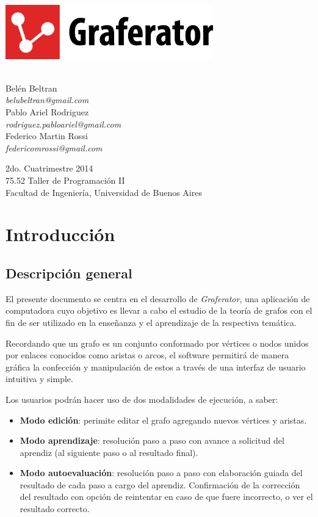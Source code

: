 \documentclass{book}
\makeatletter
\newcommand*{\titleGM}{\begingroup %
\newcommand*{\sepline}{\color{gray85}\rule[0.5ex]{30em}{0.55pt}}
	
	
\begin{center}

	\vspace*{1.5cm} 

	\includegraphics[width=9cm]{images/graferator-logo.png} \\[12\baselineskip]

	
	\colorbox{gray95}{
		\parbox[t]{1.0\linewidth}{
			\vspace*{0.7cm} %
			
			\centering {\Huge\bfseries\color{gray50}\fontfamily{fvs}\selectfont Carpeta de Desarrollo}\par %
			
			\vspace*{0.7cm} %
		}
	}\\[10\baselineskip]


		\Large Belén Beltran \\
		\large \textit{belubeltran@gmail.com} \\ \medskip
		\Large Pablo Ariel Rodriguez \\
		\large \textit{rodriguez.pabloariel@gmail.com} \\ \medskip
		\Large Federico Martin Rossi \\ 
		\large \textit{federicomrossi@gmail.com} \\

		\bigskip\bigskip

		\large 2do. Cuatrimestre 2014 \\ \smallskip
		\large 75.52 Taller de Programación II \\ \smallskip
		\large Facultad de Ingeniería, Universidad de Buenos Aires \\

\end{center}

\endgroup}
\makeatother
\begin{document}

\thispagestyle{empty}


\titleGM




\tableofcontents
\newpage
\thispagestyle{empty}
\thispagestyle{empty}
\thispagestyle{empty}



%
%
\chapter{Introducción}


\section{Descripción general}
	
El presente documento se centra en el desarrollo de \textit{Graferator}, una aplicación de computadora cuyo objetivo es llevar a cabo el estudio de la teoría de grafos con el fin de ser utilizado en la enseñanza y el aprendizaje de la respectiva temática.
\par
Recordando que un grafo es un conjunto conformado por vértices o nodos unidos por enlaces conocidos como aristas o arcos, el software permitirá de manera gráfica la confección y manipulación de estos a través de una interfaz de usuario intuitiva y simple.
\par
Los usuarios podrán hacer uso de dos modalidades de ejecución, a saber:
\medskip

	\begin{itemize}
		\renewcommand{\labelitemi}{\scriptsize\tiny$\blacksquare$} 
		\itemsep=10pt \topsep=0pt \partopsep=0pt \parskip=0pt \parsep=10pt
		
		\item \textbf{Modo edición}: perimite editar el grafo agregando nuevos vértices y aristas. 
		
		\item \textbf{Modo aprendizaje}: resolución paso a paso con avance a solicitud del aprendiz (al siguiente paso o al resultado final).

		\item \textbf{Modo autoevaluación}: resolución paso a paso con elaboración guiada del resultado de cada paso a cargo del aprendiz. Confirmación de la corrección del resultado con opción de reintentar en caso de que fuere incorrecto, o ver el resultado correcto.

	\end{itemize}
	\medskip
\end{document}
